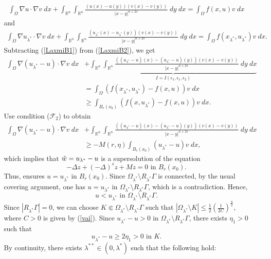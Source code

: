 \documentclass[11pt, notitlepage]{article}
\def\R{\mathbb{R}}
\newcommand{\De} {\Delta}
\begin{document}
{\begin{align}
    \int_\Omega \nabla u\cdot\nabla v\;dx+\int_{\R^n}\int_{\R^n}\frac{(u(x)-u(y))(v(x)-v(y))}{|x-y|^{n+2s}}\;dy\;dx=\int_\Omega f(x,u)v\;dx
\end{align}
and
\begin{align}\label{LaxmiB2}
    \int_\Omega \nabla u_{\lambda^*}\cdot\nabla v\;dx+\int_{\R^n}\int_{\R^n}\frac{(u_{\lambda^*}(x)-u_{\lambda^*}(y))(v(x)-v(y))}{|x-y|^{n+2s}}\;dy\;dx=\int_\Omega f(x_{\lambda^*},u_{\lambda^*})v\;dx.
\end{align}
Subtracting (\ref{LaxmiB1}) from (\ref{LaxmiB2}), we get
\begin{align}\label{LaxmiB3}
    \int_\Omega \nabla (u_{\lambda^*}-u)\cdot\nabla v\;dx&+\underbrace{\int_{\R^n}\int_{\R^n}\frac{((u_{\lambda^*}-u)(x)-(u_{\lambda^*}-u)(y))(v(x)-v(y))}{|x-y|^{n+2s}}\;dy\;dx}_{I=I(\epsilon_1,\epsilon_1,\epsilon_2)}\nonumber\\
    &=\int_\Omega (f(x_{\lambda^*},u_{\lambda^*})-f(x,u))v\;dx\nonumber\\
    &\geq \int_{B_r(x_0)} (f(x,u_{\lambda^*})-f(x,u))v\;dx.
\end{align}
Use condition ($\mathscr{F}_2$) to obtain
\begin{align*}
    \int_\Omega \nabla (u_{\lambda^*}-u)\cdot\nabla v\;dx&+\int_{\R^n}\int_{\R^n}\frac{((u_{\lambda^*}-u)(x)-(u_{\lambda^*}-u)(y))(v(x)-v(y))}{|x-y|^{n+2s}}\;dy\;dx\nonumber\\
    &\geq -M(r,\eta) \int_{B_r(x_0)} (u_{\lambda^*}-u)v\;dx,
\end{align*}
which implies that $\Tilde{w}=u_{\lambda^*}-u$ is a supersolution of the equation
$$-\De z+(-\De)^sz+Mz=0 \text{ in }B_r(x_0).$$
Thus, \cite[Proposition 3.3]{BV24} ensures $u=u_{\lambda^*}$ in $B_r(x_0)$. Since $\Omega_{\lambda^*}\setminus R_{\lambda^*}\Gamma$ is connected, by the usual covering argument, one has $u=u_{\lambda^*}$ in $\Omega_{\lambda^*}\setminus R_{\lambda^*}\Gamma$, which is a contradiction. Hence, $$u<u_{\lambda^*}\text{ in }\Omega_{\lambda^*}\setminus R_{\lambda^*}\Gamma.$$
Since $|R_{\lambda^*}\Gamma|=0$, we can choose $K\Subset \Omega_{\lambda^*}\setminus R_{\lambda^*}\Gamma$ such that 
$|\Omega_{\lambda^*}\setminus K|\leq \frac{1}{2}(\frac{1}{2C})^\frac{n}{2},$
where $C>0$ is given by (\ref{vai}). Since $u_{\lambda^*}-u>0$ in $\Omega_{\lambda^*}\setminus R_{\lambda^*}\Gamma$, there exists $\eta_1>0$ such that $$u_{\lambda^*}-u\geq 2\eta_1>0\text{ in } K.$$
By continuity, there exists $\lambda^{**}\in (0,\lambda^*)$ such that the following hold:
\begin{enumerate}

\end{enumerate}}
\end{document}
